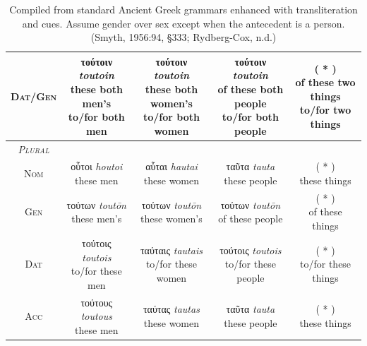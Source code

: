\documentclass[10pt,a4paper,notitlepage]{article}
\newcommand{\tsc}[1]{\textsc{#1}}
\newcommand*{\grc}[1]{\fontspec{Inter}#1\rmfamily}
\newcommand{\trc}[1]{\textit{\fontspec{Tinos}#1}}
\begin{document}
\begin{table}[H]
\begin{tabular}{c|ccc|c}
            \tsc{Dat/Gen} & \makecell{\grc{τούτοιν} \trc{toutoin} \\ \small these both men's\\ \small to/for both men} & \makecell{\grc{τούτοιν} \trc{toutoin} \\ \small these both women's\\ \small to/for both women} & \makecell{\grc{τούτοιν} \trc{toutoin} \\ \small of these both people\\ \small to/for both people}  & \makecell{( * ) \\ \small of these two things\\ \small to/for two things} \\
            \hline
            \emph{\tsc{Plural}} & & & & \\
            \tsc{Nom} & \makecell{\grc{οὗτοι} \trc{houtoi} \\ \small these men} & \makecell{\grc{αὗται} \trc{hautai} \\ \small these women} & \makecell{\grc{ταῦτα} \trc{tauta} \\ \small these people}  & \makecell{( * ) \\ \small these things} \\
            \tsc{Gen} & \makecell{\grc{τούτων} \trc{toutōn} \\ \small these men's} & \makecell{\grc{τούτων} \trc{toutōn} \\ \small these women's} & \makecell{\grc{τούτων} \trc{toutōn} \\ \small of these people}  & \makecell{( * ) \\ \small of these things} \\
            \tsc{Dat} & \makecell{\grc{τούτοις} \trc{toutois} \\ \small to/for these men} & \makecell{\grc{ταύταις} \trc{tautais}\\ \small to/for these women} & \makecell{\grc{τούτοις} \trc{toutois} \\ \small to/for these people}  & \makecell{( * ) \\ \small to/for these things} \\
            \tsc{Acc} & \makecell{\grc{τούτους} \trc{toutous} \\ \small these men} & \makecell{\grc{ταύτας} \trc{tautas} \\ \small these women} & \makecell{\grc{ταῦτα} \trc{tauta} \\ \small these people}  & \makecell{( * ) \\ \small these things} \\
        \end{tabular}
        \caption{Compiled from standard Ancient Greek grammars enhanced with transliteration and cues.
                    Assume gender over sex except when the antecedent is a person.
            (Smyth, 1956:94, \S333; Rydberg-Cox, n.d.)}
    \end{table}
\end{document}
